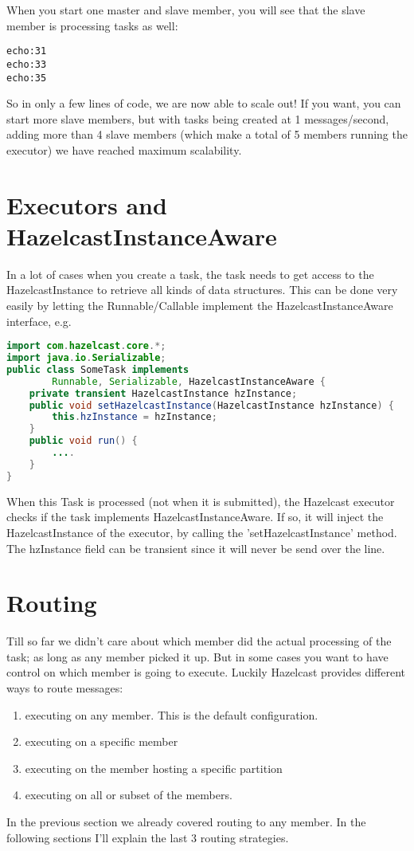 When you start one master and slave member, you will see that the slave member is processing tasks as well:
\begin{lstlisting}
echo:31
echo:33
echo:35	
\end{lstlisting}
So in only a few lines of code, we are now able to scale out! If you want, you can start more slave members, but with tasks being created at 1 messages/second, adding more than 4 slave members (which make a total of 5 members running the executor) we have reached maximum scalability. 

\section{Executors and HazelcastInstanceAware}
In a lot of cases when you create a task, the task needs to get access to the HazelcastInstance to retrieve all kinds of data structures. This can be done very easily by letting the Runnable/Callable implement the HazelcastInstanceAware interface, e.g.

\begin{lstlisting}[language=java]
import com.hazelcast.core.*;
import java.io.Serializable;
public class SomeTask implements
        Runnable, Serializable, HazelcastInstanceAware {
    private transient HazelcastInstance hzInstance;
    public void setHazelcastInstance(HazelcastInstance hzInstance) {
        this.hzInstance = hzInstance;
    }
    public void run() {
        ....
    }
}
\end{lstlisting}
When this Task is processed (not when it is submitted), the Hazelcast executor checks if the task implements HazelcastInstanceAware. If so, it will inject the HazelcastInstance of the executor, by calling the 'setHazelcastInstance' method. The hzInstance field can be transient since it will never be send over the line. 

\section{Routing}
Till so far we didn't care about which member did the actual processing of the task; as long as any member picked it up. But in some cases you want to have control on which member is going to execute. Luckily Hazelcast provides different ways to route messages:
\begin{enumerate}
\item executing on any member. This is the default configuration.
\item executing on a specific member
\item executing on the member hosting a specific partition
\item executing on all or subset of the members.
\end{enumerate}
In the previous section we already covered routing to any member. In the following sections I'll explain the last 3 routing strategies.

